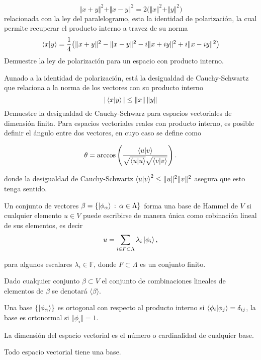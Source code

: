 \documentclass[main.tex]{subfiles}
\begin{document}
\[
\Vert x+y\Vert^2+\Vert x-y\Vert^2=2\big(\Vert x\Vert^2+\Vert y\Vert^2\big)
\]
\noindent relacionada con la ley del paralelogramo, esta la identidad de polarización, la cual permite recuperar el producto interno a travez de su norma
\[
\braket{x|y}=\frac{1}{4}\big(\Vert x+y\Vert^2-\Vert x-y\Vert^2-i\Vert x+iy\Vert^2+i\Vert x-iy\Vert^2\big)
\]
\exe Demuestre la ley de polarización para un espacio con producto interno.

Aunado a la identidad de polarización, está la desigualdad de Cauchy-Schwartz que relaciona a la norma de los vectores con su producto interno
\begin{equation}
  |\braket{x|y}|\leq\| x\|\,\| y\|
\end{equation}
\exe Demuestre la desigualdad de Cauchy-Schwarz para espacios vectoriales de dimensión finita.
Para espacios vectoriales reales con producto interno, es posible definir el ángulo entre dos vectores, en cuyo caso se define como

\[
\theta = \arccos\left(\frac{\braket{u | v}}{\sqrt{\braket{u | u}} \sqrt{\braket{v | v}}}\right).
\]

\noindent donde la desigualdad de Cauchy-Schwartz \(\braket{u | v}^2 \leq \Vert u\Vert^2\Vert v \Vert^2\) asegura que esto tenga sentido.

\begin{def.}
Un conjunto de vectores \(\beta=\{\ket{\phi_{\alpha}}\,:\,\alpha\in \Lambda \}\) forma una base de Hammel de \(V\) si cualquier elemento \(u \in V\) puede escribirse de manera única como cobinación lineal de sus elementos, es decir
\[
u = \sum_{i\in F\subset\Lambda} \lambda_i \ket{\phi_i},
\]

\noindent para algunos escalares \(\lambda_i\in\mathbb{F}\), donde \(F\subset\Lambda\) es un conjunto finito.

\noindent Dado cualquier conjunto \(\beta\subset V\) el conjunto de combinaciones lineales de elementos de \(\beta\) se denotará \(\langle\beta\rangle\).

\noindent Una base \(\{\ket{\phi_{\alpha}}\}\) es ortogonal con respecto al producto interno si \(\braket{\phi_i | \phi_j}=\delta_{ij}\), la base es ortonormal si \(\Vert \phi_i\Vert = 1\).

\noindent La dimensión del espacio vectorial es el número o cardinalidad de cualquier base.
\end{def.}

\begin{teorema}
  Todo espacio vectorial tiene una base.
\end{teorema}
\end{document}
